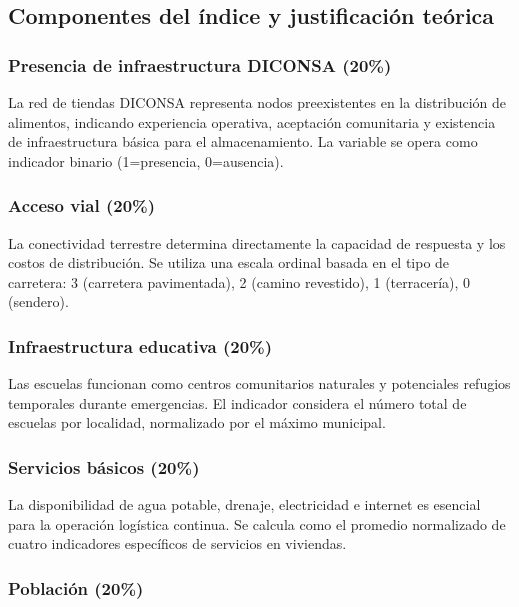 \documentclass[
  spanish,
  us-letterpaper,
]{scrreprt}
\numberwithin{equation}{chapter} %
\begin{document}
\subsection{Componentes del índice y justificación
teórica}\label{componentes-del-uxedndice-y-justificaciuxf3n-teuxf3rica}

\subsubsection{Presencia de infraestructura DICONSA
(20\%)}\label{presencia-de-infraestructura-diconsa-20}

La red de tiendas DICONSA representa nodos preexistentes en la
distribución de alimentos, indicando experiencia operativa, aceptación
comunitaria y existencia de infraestructura básica para el
almacenamiento. La variable se opera como indicador binario
(1=presencia, 0=ausencia).

\subsubsection{Acceso vial (20\%)}\label{acceso-vial-20}

La conectividad terrestre determina directamente la capacidad de
respuesta y los costos de distribución. Se utiliza una escala ordinal
basada en el tipo de carretera: 3 (carretera pavimentada), 2 (camino
revestido), 1 (terracería), 0 (sendero).

\subsubsection{Infraestructura educativa
(20\%)}\label{infraestructura-educativa-20}

Las escuelas funcionan como centros comunitarios naturales y potenciales
refugios temporales durante emergencias. El indicador considera el
número total de escuelas por localidad, normalizado por el máximo
municipal.

\subsubsection{Servicios básicos (20\%)}\label{servicios-buxe1sicos-20}

La disponibilidad de agua potable, drenaje, electricidad e internet es
esencial para la operación logística continua. Se calcula como el
promedio normalizado de cuatro indicadores específicos de servicios en
viviendas.

\subsubsection{Población (20\%)}\label{poblaciuxf3n-20}
\end{document}
